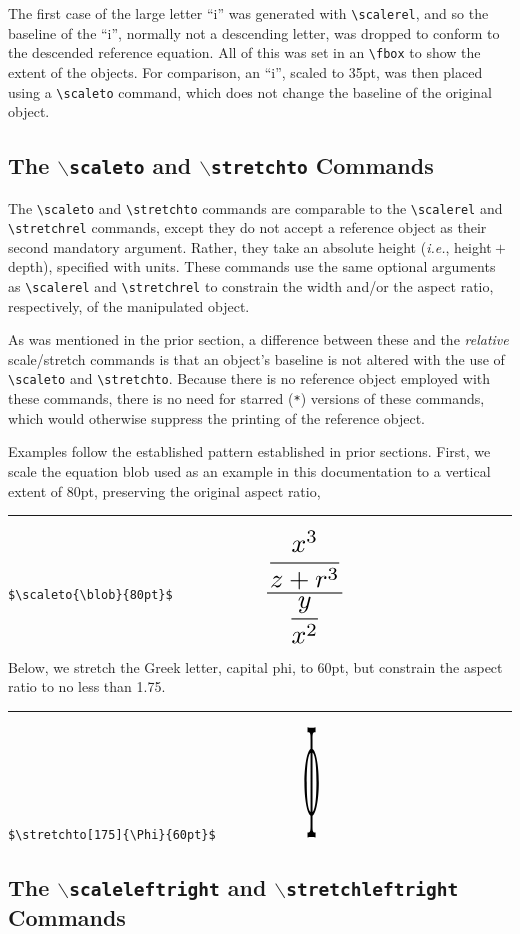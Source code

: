 \documentclass{article}
\newcommand\rl{\rule{2em}{0in}}
\let\vb\verb
\begin{document}
The first case of the large letter ``i'' was generated with 
  \vb|\scalerel|, and so the baseline of the ``i'', normally not a
  descending letter, was dropped to conform to the descended reference
  equation.  
All of this was set in an \vb|\fbox| to show the extent of
  the objects.  
For comparison, an ``i'', scaled to 35pt, was then placed
  using a \vb|\scaleto| command, which does not change the baseline of
  the original object.

\subsection{The $\backslash$\texttt{scaleto} and
$\backslash$\texttt{stretchto} Commands}

The \vb|\scaleto| and \vb|\stretchto| commands are comparable to the
  \vb|\scalerel| and \vb|\stretchrel| commands, except they do not
  accept a reference object as their second mandatory argument.  
Rather, they take an absolute height (\textit{i.e.}, height${}+{}$depth),
  specified with units.  
These commands use the same optional arguments as \vb|\scalerel| and
  \vb|\stretchrel| to constrain the width and/or the aspect ratio, 
  respectively, of the manipulated object.

As was mentioned in the prior section, a difference between these and
  the \textit{relative} scale/stretch commands is that an object's 
  baseline is not altered with the use of \vb|\scaleto| and 
  \vb|\stretchto|.  
Because there is no reference object employed with these commands, 
  there is no need for starred (\vb|*|) versions of these commands,
  which would otherwise suppress the printing of the reference object.

Examples follow the established pattern established in prior sections.
First, we scale the equation blob used as an example in this
documentation to a vertical extent of 80pt, preserving the original
aspect ratio,

\rl\vb|$\scaleto{\blob}{80pt}$      | $\scaleto{\blob}{80pt}$

Below, we stretch the Greek letter, capital phi, to 60pt, but constrain
the aspect ratio to no less than 1.75.

\rl\vb|$\stretchto[175]{\Phi}{60pt}$      | $\stretchto[175]{\Phi}{80pt}$

\subsection{The $\backslash$\texttt{scaleleftright} and
 $\backslash$\texttt{stretchleftright}\\Commands}
\end{document}
